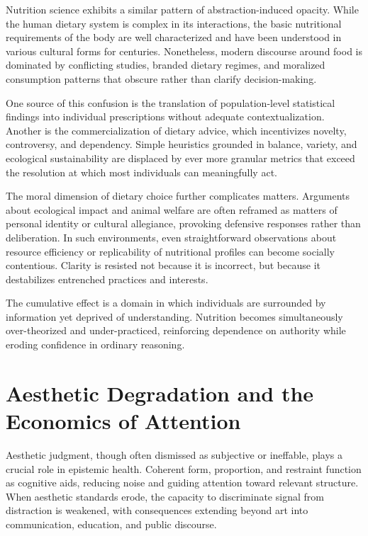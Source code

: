 \documentclass[12pt]{article}
\begin{document}
Nutrition science exhibits a similar pattern of abstraction-induced opacity. While the human dietary system is complex in its interactions, the basic nutritional requirements of the body are well characterized and have been understood in various cultural forms for centuries. Nonetheless, modern discourse around food is dominated by conflicting studies, branded dietary regimes, and moralized consumption patterns that obscure rather than clarify decision-making.

One source of this confusion is the translation of population-level statistical findings into individual prescriptions without adequate contextualization. Another is the commercialization of dietary advice, which incentivizes novelty, controversy, and dependency. Simple heuristics grounded in balance, variety, and ecological sustainability are displaced by ever more granular metrics that exceed the resolution at which most individuals can meaningfully act.

The moral dimension of dietary choice further complicates matters. Arguments about ecological impact and animal welfare are often reframed as matters of personal identity or cultural allegiance, provoking defensive responses rather than deliberation. In such environments, even straightforward observations about resource efficiency or replicability of nutritional profiles can become socially contentious. Clarity is resisted not because it is incorrect, but because it destabilizes entrenched practices and interests.

The cumulative effect is a domain in which individuals are surrounded by information yet deprived of understanding. Nutrition becomes simultaneously over-theorized and under-practiced, reinforcing dependence on authority while eroding confidence in ordinary reasoning.

\section{Aesthetic Degradation and the Economics of Attention}

Aesthetic judgment, though often dismissed as subjective or ineffable, plays a crucial role in epistemic health. Coherent form, proportion, and restraint function as cognitive aids, reducing noise and guiding attention toward relevant structure. When aesthetic standards erode, the capacity to discriminate signal from distraction is weakened, with consequences extending beyond art into communication, education, and public discourse.
\end{document}
